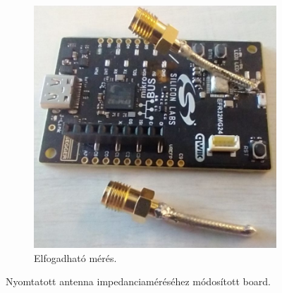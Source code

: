 \begin{figure}
\begin{subfigure}{0.35\textwidth}
                    \includegraphics[width=\textwidth]{kep/szerkesztett/pigtail2.jpg}
                    \caption{Elfogadható mérés.}
                    \label{fig:pigtail2}
                \end{subfigure}
                \caption{Nyomtatott antenna impedanciaméréséhez módosított board.}
                \label{fig:pigtail}
            \end{figure}
